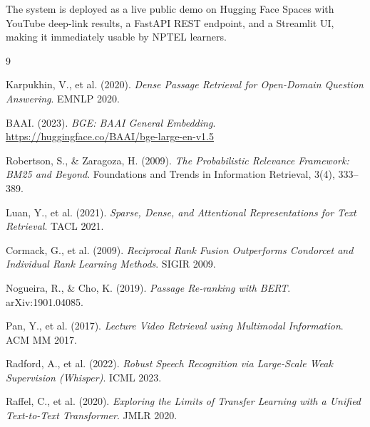 \documentclass[12pt,a4paper]{article}
\begin{document}
The system is deployed as a live public demo on Hugging Face Spaces with YouTube deep-link results, a FastAPI REST endpoint, and a Streamlit UI, making it immediately usable by NPTEL learners.

\newpage

\begin{thebibliography}{9}

Karpukhin, V., et al. (2020).
\textit{Dense Passage Retrieval for Open-Domain Question Answering}.
EMNLP 2020.

BAAI. (2023).
\textit{BGE: BAAI General Embedding}.
\url{https://huggingface.co/BAAI/bge-large-en-v1.5}

Robertson, S., \& Zaragoza, H. (2009).
\textit{The Probabilistic Relevance Framework: BM25 and Beyond}.
Foundations and Trends in Information Retrieval, 3(4), 333--389.

Luan, Y., et al. (2021).
\textit{Sparse, Dense, and Attentional Representations for Text Retrieval}.
TACL 2021.

Cormack, G., et al. (2009).
\textit{Reciprocal Rank Fusion Outperforms Condorcet and Individual Rank Learning Methods}.
SIGIR 2009.

Nogueira, R., \& Cho, K. (2019).
\textit{Passage Re-ranking with BERT}.
arXiv:1901.04085.

Pan, Y., et al. (2017).
\textit{Lecture Video Retrieval using Multimodal Information}.
ACM MM 2017.

Radford, A., et al. (2022).
\textit{Robust Speech Recognition via Large-Scale Weak Supervision (Whisper)}.
ICML 2023.

Raffel, C., et al. (2020).
\textit{Exploring the Limits of Transfer Learning with a Unified Text-to-Text Transformer}.
JMLR 2020.

\end{thebibliography}
\end{document}
